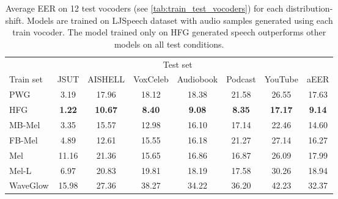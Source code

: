 \begin{table*}[htb!]
    \caption{Average EER on 12 test vocoders (see \autoref{tab:train_test_vocoders}) for each distribution-shift. Models are trained on LJSpeech dataset with audio samples generated using each train vocoder. The model trained only on HFG generated speech outperforms other models on all test conditions.}
    \label{tab:indv_voc}
     \vskip 0.15in
\begin{center}
\begin{small}
\begin{sc}
    \begin{tabular}{lccccccc}
    \toprule
     & \multicolumn{6}{c}{Test set} \\
      \cmidrule(lr){2-8}
Train set & JSUT & AISHELL &VoxCeleb & Audiobook & Podcast & YouTube & aEER\\ 
    \midrule
    PWG & 3.19 & 17.96& 18.12&18.38&21.58 &26.55 & 17.63\\
    \hline
    HFG & \textbf{1.22} &\textbf{10.67} &\textbf{8.40} &\textbf{9.08} &\textbf{8.35}&\textbf{17.17} & \textbf{9.14}\\
    \hline
    MB-Mel & 3.35 &15.57 &12.98 &16.10 &17.14&22.46 & 14.60\\
    \hline
    FB-Mel &4.89  &12.61 &15.55 &16.18 &21.27& 27.14& 16.27\\
    \hline
    Mel & 11.16 &21.36 &15.65 &16.86 &16.87& 26.09& 17.99\\
    \hline
   Mel-L & 6.97 &20.83&19.81 &18.19&17.58&30.26 & 18.94\\
   \hline
   WaveGlow &15.98 &27.36 &38.27 &34.22 &36.20& 42.23& 32.37\\
         \bottomrule 
    \end{tabular}
    \end{sc}
\end{small}
\end{center}
\vskip -0.1in
\end{table*}

